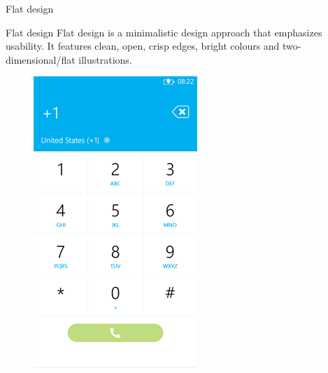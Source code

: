 \documentclass{beamer}
\begin{document}
	\begin{frame}{Flat design}
	\begin{block}{Flat design}
	Flat design is a minimalistic design approach that emphasizes usability. It features clean, open, crisp edges, bright colours and two-dimensional/flat illustrations.
	\end{block}
    \begin{figure}
    \includegraphics[scale=0.35]{dial-flat.png}
    \end{figure}
	
	\end{frame}
    
\end{document}
